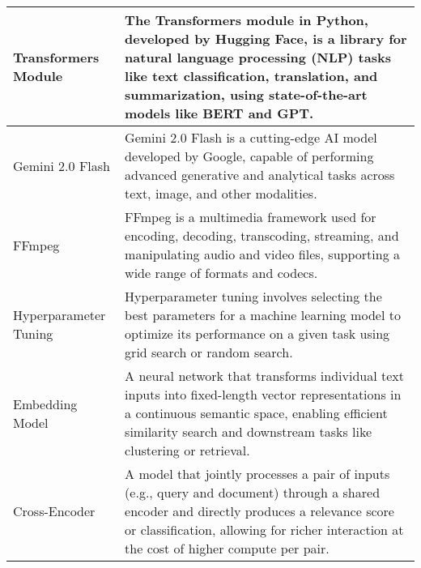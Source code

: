 \begin{center}
\begin{tabular}{|p{4cm}|p{10cm}|}
  \hline
  Transformers Module & The Transformers module in Python, developed by Hugging Face, is a library for natural language processing (NLP) tasks like text classification, translation, and summarization, using state-of-the-art models like BERT and GPT. \\

  \hline
  Gemini 2.0 Flash & Gemini 2.0 Flash is a cutting-edge AI model developed by Google, capable of performing advanced generative and analytical tasks across text, image, and other modalities. \\

  \hline
  FFmpeg & FFmpeg is a multimedia framework used for encoding, decoding, transcoding, streaming, and manipulating audio and video files, supporting a wide range of formats and codecs. \\

  \hline
  Hyperparameter Tuning & Hyperparameter tuning involves selecting the best parameters for a machine learning model to optimize its performance on a given task using grid search or random search. \\

  \hline
  Embedding Model & A neural network that transforms individual text inputs into fixed-length vector representations in a continuous semantic space, enabling efficient similarity search and downstream tasks like clustering or retrieval. \\

  \hline
  Cross-Encoder & A model that jointly processes a pair of inputs (e.g., query and document) through a shared encoder and directly produces a relevance score or classification, allowing for richer interaction at the cost of higher compute per pair. \\

  \hline
\end{tabular}
  
\end{center}


